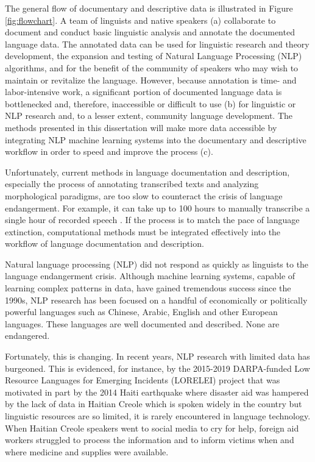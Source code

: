 The general flow of documentary and descriptive data is illustrated in Figure \ref{fig:flowchart}. A team of linguists and native speakers (a) collaborate to document and conduct basic linguistic analysis and annotate the documented language data. The annotated data can be used for linguistic research and theory development, the expansion and testing of Natural Language Processing (NLP) algorithms, and for the benefit of the community of speakers who may wish to maintain or revitalize the language. However, because annotation is time- and labor-intensive work, a significant portion of documented language data is bottlenecked and, therefore, inaccessible or difficult to use (b) for linguistic or NLP research and, to a lesser extent, community language development. The methods presented in this dissertation will make more data accessible by integrating NLP machine learning systems into the documentary and descriptive workflow in order to speed and improve the process (c).

Unfortunately, current methods in language documentation and description, especially the process of annotating transcribed texts and analyzing morphological paradigms, are too slow to counteract the crisis of language endangerment. For example, it can take up to 100 hours to manually transcribe a single hour of recorded speech \citep{seifart_language_2018}.
If the process is to match the pace of language extinction, computational methods must be integrated effectively into the workflow of language documentation and description. 

Natural language processing (NLP) did not respond as quickly as linguists to the language endangerment crisis. Although machine learning systems, capable of learning complex patterns in data, have gained tremendous success since the 1990s, NLP research has been focused on a handful of economically or politically powerful languages such as Chinese, Arabic, English and other European languages. These languages are well documented and described. None 
are endangered.

Fortunately, this is changing. In recent years, NLP research with limited data has burgeoned. This is evidenced, for instance, by the 2015-2019 DARPA-funded Low Resource Languages for Emerging Incidents (LORELEI) project that was motivated in part by the 2014 Haiti earthquake where disaster aid was hampered by the lack of data in Haitian Creole which is spoken widely in the country but linguistic resources are so limited, it is rarely encountered in language technology. When Haitian Creole speakers went to social media to cry for help, foreign aid workers struggled to process the information and to inform victims when and where medicine and supplies were available.


